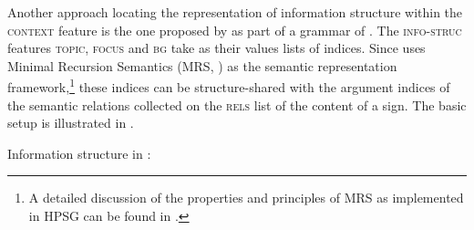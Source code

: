 \documentclass[output=paper,biblatex,babelshorthands,newtxmath,draftmode,colorlinks,citecolor=brown]{langscibook}
\begin{document}
Another approach locating the representation of information structure
within the \textsc{context} feature is the one proposed by
\citet{Paggio2009a-u} as part of a grammar of . The
\textsc{info-struc} features \textsc{topic}, \textsc{focus} and
\textsc{bg} take as their values lists of indices. Since
\citet{Paggio2009a-u} uses Minimal Recursion Semantics (MRS,
\citealt{CFPS2005a}) as the semantic representation framework,\footnote{A detailed
  discussion of the properties and principles of MRS as implemented in
  HPSG can be found in .} these indices
can be structure-shared with the argument indices of the semantic
relations collected on the \textsc{rels} list of the content of a
sign. The basic setup is illustrated in .

\ea\label{fig:paggio-infostr}
Information structure in :\\
        \leavevmode
{}
\z
\end{document}
